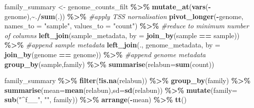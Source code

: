 \documentclass[
]{book}
\newenvironment{Shaded}{\begin{snugshade}}{\end{snugshade}}
\newcommand{\AttributeTok}[1]{\textcolor[rgb]{0.13,0.29,0.53}{#1}}
\newcommand{\CommentTok}[1]{\textcolor[rgb]{0.56,0.35,0.01}{\textit{#1}}}
\newcommand{\FunctionTok}[1]{\textcolor[rgb]{0.13,0.29,0.53}{\textbf{#1}}}
\newcommand{\NormalTok}[1]{#1}
\newcommand{\OtherTok}[1]{\textcolor[rgb]{0.56,0.35,0.01}{#1}}
\newcommand{\SpecialCharTok}[1]{\textcolor[rgb]{0.81,0.36,0.00}{\textbf{#1}}}
\newcommand{\StringTok}[1]{\textcolor[rgb]{0.31,0.60,0.02}{#1}}
\begin{document}
\begin{Shaded}
\begin{Highlighting}[]
\NormalTok{family\_summary }\OtherTok{\textless{}{-}}\NormalTok{ genome\_counts\_filt }\SpecialCharTok{\%\textgreater{}\%}
  \FunctionTok{mutate\_at}\NormalTok{(}\FunctionTok{vars}\NormalTok{(}\SpecialCharTok{{-}}\NormalTok{genome),}\SpecialCharTok{\textasciitilde{}}\NormalTok{.}\SpecialCharTok{/}\FunctionTok{sum}\NormalTok{(.)) }\SpecialCharTok{\%\textgreater{}\%} \CommentTok{\#apply TSS nornalisation}
  \FunctionTok{pivot\_longer}\NormalTok{(}\SpecialCharTok{{-}}\NormalTok{genome, }\AttributeTok{names\_to =} \StringTok{"sample"}\NormalTok{, }\AttributeTok{values\_to =} \StringTok{"count"}\NormalTok{) }\SpecialCharTok{\%\textgreater{}\%} \CommentTok{\#reduce to minimum number of columns}
  \FunctionTok{left\_join}\NormalTok{(sample\_metadata, }\AttributeTok{by =} \FunctionTok{join\_by}\NormalTok{(sample }\SpecialCharTok{==}\NormalTok{ sample)) }\SpecialCharTok{\%\textgreater{}\%} \CommentTok{\#append sample metadata}
  \FunctionTok{left\_join}\NormalTok{(., genome\_metadata, }\AttributeTok{by =} \FunctionTok{join\_by}\NormalTok{(genome }\SpecialCharTok{==}\NormalTok{ genome)) }\SpecialCharTok{\%\textgreater{}\%} \CommentTok{\#append genome metadata}
  \FunctionTok{group\_by}\NormalTok{(sample,family) }\SpecialCharTok{\%\textgreater{}\%}
  \FunctionTok{summarise}\NormalTok{(}\AttributeTok{relabun=}\FunctionTok{sum}\NormalTok{(count))}

\NormalTok{family\_summary }\SpecialCharTok{\%\textgreater{}\%}
    \FunctionTok{filter}\NormalTok{(}\SpecialCharTok{!}\FunctionTok{is.na}\NormalTok{(relabun)) }\SpecialCharTok{\%\textgreater{}\%}
    \FunctionTok{group\_by}\NormalTok{(family) }\SpecialCharTok{\%\textgreater{}\%}
    \FunctionTok{summarise}\NormalTok{(}\AttributeTok{mean=}\FunctionTok{mean}\NormalTok{(relabun),}\AttributeTok{sd=}\FunctionTok{sd}\NormalTok{(relabun)) }\SpecialCharTok{\%\textgreater{}\%}
    \FunctionTok{mutate}\NormalTok{(}\AttributeTok{family=} \FunctionTok{sub}\NormalTok{(}\StringTok{"\^{}f\_\_"}\NormalTok{, }\StringTok{""}\NormalTok{, family)) }\SpecialCharTok{\%\textgreater{}\%}
    \FunctionTok{arrange}\NormalTok{(}\SpecialCharTok{{-}}\NormalTok{mean) }\SpecialCharTok{\%\textgreater{}\%}
    \FunctionTok{tt}\NormalTok{()}
\end{Highlighting}
\end{Shaded}
\end{document}
